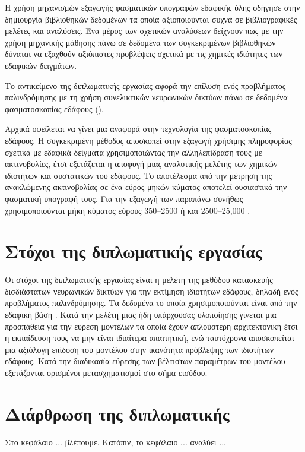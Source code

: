 Η χρήση μηχανισμών εξαγωγής φασματικών υπογραφών εδαφικής ύλης οδήγησε στην δημιουργία βιβλιοθηκών δεδομένων τα οποία αξιοποιούνται συχνά σε βιβλιογραφικές μελέτες και αναλύσεις. Ένα μέρος των σχετικών αναλύσεων δείχνουν πως με την χρήση μηχανικής μάθησης πάνω σε δεδομένα των συγκεκριμένων βιβλιοθηκών δύναται να εξαχθούν αξιόπιστες προβλέψεις σχετικά με τις χημικές ιδιότητες των εδαφικών δειγμάτων.

Το αντικείμενο της διπλωματικής εργασίας αφορά την επίλυση ενός προβλήματος παλινδρόμησης με τη χρήση συνελικτικών νευρωνικών δικτύων πάνω σε δεδομένα φασματοσκοπίας εδάφους ().

Αρχικά οφείλεται να γίνει μια αναφορά στην τεχνολογία της φασματοσκοπίας εδάφους. Η συγκεκριμένη μέθοδος αποσκοπεί στην εξαγωγή χρήσιμης πληροφορίας σχετικά με εδαφικά δείγματα χρησιμοποιώντας την αλληλεπίδραση τους με ακτινοβολίες, έτσι εξετάζεται η αποφυγή μιας αναλυτικής μελέτης των χημικών ιδιοτήτων και συστατικών του εδάφους. Το αποτέλεσμα από την μέτρηση της ανακλώμενης ακτινοβολίας σε ένα εύρος μηκών κύματος αποτελεί ουσιαστικά την φασματική υπογραφή τους. Για την εξαγωγή των παραπάνω συνήθως χρησιμοποιούνται μήκη κύματος εύρους 350–2500  ή και 2500–25,000 .

\section{Στόχοι της διπλωματικής εργασίας}
Οι στόχοι της διπλωματικής εργασίας είναι η μελέτη της μεθόδου κατασκευής δισδιάστατων νευρωνικών δικτύων για την εκτίμηση ιδιοτήτων εδάφους, δηλαδή ενός προβλήματος παλινδρόμησης. Τα δεδομένα το οποία χρησιμοποιούνται είναι από την εδαφική βάση  \cite{lucas_soil}. Κατά την μελέτη μιας ήδη υπάρχουσας υλοποίησης γίνεται μια προσπάθεια για την εύρεση μοντέλων τα οποία έχουν απλούστερη αρχιτεκτονική έτσι η εκπαίδευση τους να μην είναι ιδιαίτερα απαιτητική, ενώ ταυτόχρονα αποσκοπείται μια αξιόλογη επίδοση του μοντέλου στην ικανότητα πρόβλεψης των ιδιοτήτων εδάφους. Κατά την διαδικασία εύρεσης των βέλτιστων παραμέτρων του μοντέλου εξετάζονται ορισμένοι μετασχηματισμοί στο σήμα εισόδου.

\section{Διάρθρωση της διπλωματικής}

Στο κεφάλαιο ... βλέπουμε. Κατόπιν, το κεφάλαιο ... αναλύει ...
